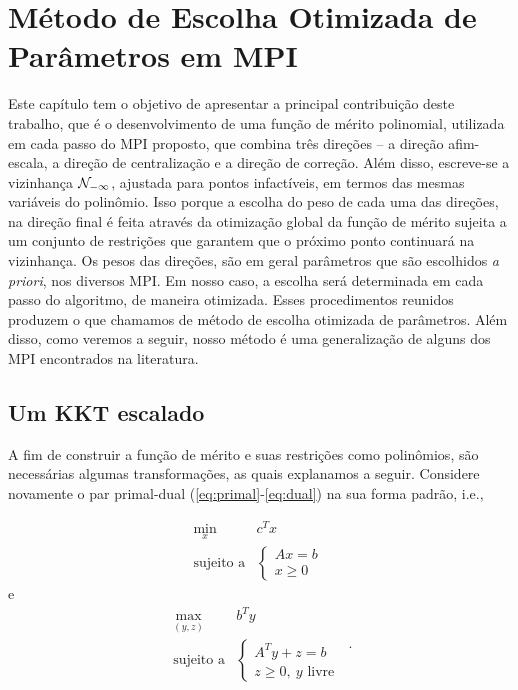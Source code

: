 





	\chapter{Método de Escolha Otimizada de Parâmetros em \ac{MPI}}
\label{chap:merit-function}


Este capítulo tem o objetivo de apresentar a principal contribuição deste trabalho, que é o desenvolvimento de uma função de mérito polinomial,  utilizada em cada passo do \acl{MPI} proposto,  que combina três direções -- a direção afim-escala, a direção de centralização e a direção de correção. Além disso, escreve-se a vizinhança $\mathcal{N}_{-\infty}$, ajustada para pontos infactíveis, em termos das mesmas variáveis do polinômio. Isso porque a escolha do peso de cada uma das direções,  na direção final é feita através da  otimização global da função de mérito sujeita a um conjunto de restrições que garantem que o próximo ponto continuará na vizinhança. Os pesos das direções, são em geral parâmetros que são escolhidos  \emph{a priori}, nos diversos \ac{MPI}.  Em nosso caso, a escolha será determinada em cada passo do algoritmo, de maneira otimizada.  Esses procedimentos reunidos produzem o que chamamos de   método de escolha otimizada de parâmetros. Além disso, como veremos a seguir,  nosso método é uma generalização de alguns dos \ac{MPI} encontrados na literatura. 

\section{Um KKT escalado}


 
A fim de construir a função de mérito e suas restrições como polinômios, são necessárias algumas transformações, as quais explanamos a seguir. Considere novamente o par primal-dual  (\ref{eq:primal}-\ref{eq:dual}) na sua forma padrão,
i.e.,  

 \begin{equation*}
	\begin{array}{lc}
\displaystyle \min_{x} & c^Tx \\
\text{sujeito a} &\begin{cases} Ax = b \\
				 x \geq 0	
				 \end{cases}\
\end{array}\tag{$P$}
\end{equation*}
e 
 \begin{equation}
	\begin{array}{lc}
\displaystyle \max_{(y,z)} & b^Ty \\
\text{sujeito a} &\begin{cases} A^Ty + z = b \\
				 z \geq 0, \:y \text{ livre}	
				 \end{cases}\
\end{array}.
\tag{$D$}
\end{equation}

